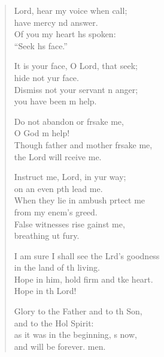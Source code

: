 \begin{verse}
  \begin{patverse}
 Lord, hear my voice when  call;\Med\\
have mercy nd answer.\\
Of you my heart hs spoken:\Med\\
“Seek h\pointup{\i}s face.”

It is your face, O Lord, that  seek;\Med\\
hide not yur face.\\
Dismiss not your servant \pointup{\i}n anger;\Med\\
you have been m help.

Do not abandon or frsake me,\Med\\
O God m help!\\
Though father and mother frsake me,\Med\\
the Lord will rceive me.

Instruct me, Lord, in yur way;\Med\\
on an even pth lead me.\\
When they lie in ambush prtect me\Med\\
from my enem’s greed.\\
False witnesses rise gainst me,\Med\\
breathing ut fury.

I am sure I shall see the Lrd’s goodness\Med\\
in the land of th living.\\
Hope in him, hold firm and tke heart.\Med\\
Hope in th Lord!

Glory to the Father and to th Son,\Med\\
and to the Hol Spirit:\\
as it was in the beginning, \pointup{\i}s now,\Med\\
and will be forever. men.
  \end{patverse}
\end{verse}
